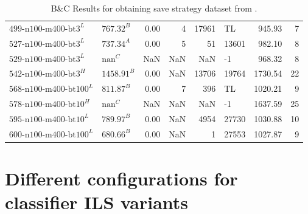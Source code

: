 \begin{table}[ht]
\begin{tabular}{llrrrlrr}
		$\text{499-n100-m400-bt3}^L$   & $\text{767.32}^B$  & 0.00 & 4     & 17961  & TL    & 945.93  & 7     \\
		$\text{527-n100-m400-bt3}^L$   & $\text{737.34}^A$  & 0.00 & 5     & 51     & 13601 & 982.10  & 8     \\
		$\text{529-n100-m400-bt3}^L$   & $\text{nan}^C$     & NaN  & NaN   & NaN    & -1    & 968.32  & 8     \\
		$\text{542-n100-m400-bt3}^H$   & $\text{1458.91}^B$ & 0.00 & NaN   & 13706  & 19764 & 1730.54 & 22    \\
		$\text{568-n100-m400-bt100}^L$ & $\text{811.87}^B$  & 0.00 & 7     & 396    & TL    & 1020.21 & 9     \\
		$\text{578-n100-m400-bt10}^H$  & $\text{nan}^C$     & NaN  & NaN   & NaN    & -1    & 1637.59 & 25    \\
		$\text{595-n100-m400-bt10}^L$  & $\text{789.97}^B$  & 0.00 & NaN   & 4954   & 27730 & 1030.88 & 10    \\
		$\text{600-n100-m400-bt100}^L$ & $\text{680.66}^B$  & 0.00 & NaN   & 1      & 27553 & 1027.87 & 9     \\
		\bottomrule
	\end{tabular}
	\caption{B\&C Results for obtaining save strategy dataset from \krebsADataSet.}
	\label{tab:bc_results_krebs}
\end{table}

\clearpage
\section{Different configurations for classifier ILS variants}
\label{sec_final_comparison_results}

